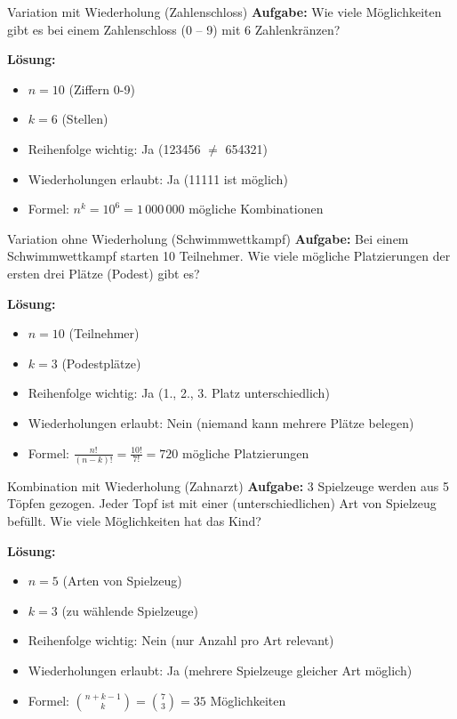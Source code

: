 \begin{example}{Variation mit Wiederholung (Zahlenschloss)}
\textbf{Aufgabe:} Wie viele Möglichkeiten gibt es bei einem Zahlenschloss (0 -- 9) mit 6 Zahlenkränzen?

\textbf{Lösung:}
\begin{itemize}
\item $n = 10$ (Ziffern 0-9)
\item $k = 6$ (Stellen)
\item Reihenfolge wichtig: Ja (123456 $\neq$ 654321)
\item Wiederholungen erlaubt: Ja (11111 ist möglich)
\item Formel: $n^k = 10^6 = 1\,000\,000$ mögliche Kombinationen
\end{itemize}
\end{example}

\begin{example}{Variation ohne Wiederholung (Schwimmwettkampf)}
\textbf{Aufgabe:} Bei einem Schwimmwettkampf starten 10 Teilnehmer. Wie viele mögliche Platzierungen der ersten drei Plätze (Podest) gibt es?

\textbf{Lösung:}
\begin{itemize}
\item $n = 10$ (Teilnehmer)
\item $k = 3$ (Podestplätze)
\item Reihenfolge wichtig: Ja (1., 2., 3. Platz unterschiedlich)
\item Wiederholungen erlaubt: Nein (niemand kann mehrere Plätze belegen)
\item Formel: $\frac{n!}{(n-k)!} = \frac{10!}{7!} = 720$ mögliche Platzierungen
\end{itemize}
\end{example}

\begin{example}{Kombination mit Wiederholung (Zahnarzt)}
\textbf{Aufgabe:} 3 Spielzeuge werden aus 5 Töpfen gezogen. Jeder Topf ist mit einer (unterschiedlichen) Art von Spielzeug befüllt. Wie viele Möglichkeiten hat das Kind?

\textbf{Lösung:}
\begin{itemize}
\item $n = 5$ (Arten von Spielzeug)
\item $k = 3$ (zu wählende Spielzeuge)
\item Reihenfolge wichtig: Nein (nur Anzahl pro Art relevant)
\item Wiederholungen erlaubt: Ja (mehrere Spielzeuge gleicher Art möglich)
\item Formel: $\binom{n+k-1}{k} = \binom{7}{3} = 35$ Möglichkeiten
\end{itemize}
\end{example}

